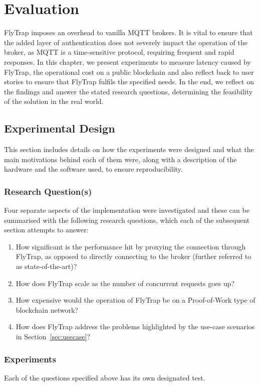 \chapter{Evaluation}\label{chap:evaluation}
FlyTrap imposes an overhead to vanilla MQTT brokers. It is vital to ensure that the added layer of authentication does not severely impact the operation of the broker, as MQTT is a time-sensitive protocol, requiring frequent and rapid responses. In this chapter, we present experiments to measure latency caused by FlyTrap, the operational cost on a public blockchain and also reflect back to user stories to ensure that FlyTrap fulfils the specified needs. In the end, we reflect on the findings and answer the stated research questions, determining the feasibility of the solution in the real world.

\section{Experimental Design}
This section includes details on how the experiments were designed and what the main motivations behind each of them were, along with a description of the hardware and the software used, to ensure reproducibility.
\subsection{Research Question(s)}
Four separate aspects of the implementation were investigated and these can be summarised with the following research questions, which each of the subsequent section attempts to answer:
\begin{enumerate}
  \item How significant is the performance hit by proxying the connection through FlyTrap, as opposed to directly connecting to the broker (further referred to as state-of-the-art)?
  \item How does FlyTrap scale as the number of concurrent requests goes up?
  \item How expensive would the operation of FlyTrap be on a Proof-of-Work type of blockchain network?
  \item How does FlyTrap address the problems highlighted by the use-case scenarios in Section~\ref{sec:usecase}?
\end{enumerate}
\subsection{Experiments}
Each of the questions specified above has its own designated test.

